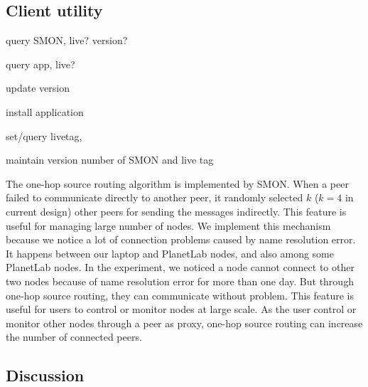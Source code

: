 \subsection{Client utility}

query SMON, live? version?

query app, live?

update version

install application

set/query livetag, 

maintain version number of SMON and live tag


The one-hop source routing\cite{Gummadi2004} algorithm is
implemented by SMON. When a peer failed to communicate directly
to another peer, it randomly selected $k$ ($k=4$ in current
design) other peers for sending the messages indirectly.  This
feature is useful for managing large number of nodes. We
implement this mechanism because we notice a lot of connection
problems caused by name resolution error. It happens between our
laptop and PlanetLab nodes, and also among some PlanetLab nodes.
In the experiment, we noticed a node cannot connect to other two
nodes because of name resolution error for more than one day.
But through one-hop source routing, they can communicate without
problem. This feature is useful for users to control or monitor
nodes at large scale. As the user control or monitor other nodes
through a peer as proxy, one-hop source routing can increase the
number of connected peers.

\subsection{Discussion}




